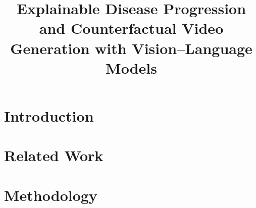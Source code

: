 \documentclass[conference]{IEEEtran}
\begin{document}
%
\title{Explainable Disease Progression and Counterfactual Video Generation with Vision–Language Models}



\author{

}


\maketitle

\begin{abstract}


\end{abstract}

\IEEEpeerreviewmaketitle

\section{Introduction}


\section{Related Work}




\section{Methodology}
\label{sec:methodology}
\end{document}
